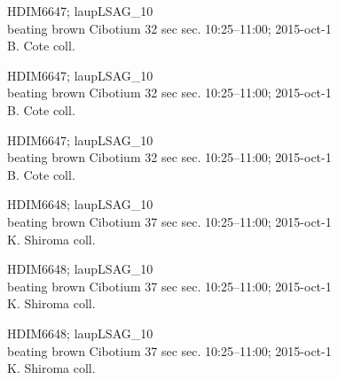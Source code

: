 \documentclass[2pt]{extarticle}
\begin{document}
\noindent
\parbox{0.16\textwidth}{\tiny \raggedright \rule[-0.3\baselineskip]{0pt}{10pt}HDIM6647; laupLSAG\_10\\ beating brown Cibotium 32 sec sec. 10:25--11:00; 2015-oct-1\\ B. Cote coll.}
\parbox{0.16\textwidth}{\tiny \raggedright \rule[-0.3\baselineskip]{0pt}{10pt}HDIM6647; laupLSAG\_10\\ beating brown Cibotium 32 sec sec. 10:25--11:00; 2015-oct-1\\ B. Cote coll.}
\parbox{0.16\textwidth}{\tiny \raggedright \rule[-0.3\baselineskip]{0pt}{10pt}HDIM6647; laupLSAG\_10\\ beating brown Cibotium 32 sec sec. 10:25--11:00; 2015-oct-1\\ B. Cote coll.}
\parbox{0.16\textwidth}{\tiny \raggedright \rule[-0.3\baselineskip]{0pt}{10pt}HDIM6648; laupLSAG\_10\\ beating brown Cibotium 37 sec sec. 10:25--11:00; 2015-oct-1\\ K. Shiroma coll.}
\parbox{0.16\textwidth}{\tiny \raggedright \rule[-0.3\baselineskip]{0pt}{10pt}HDIM6648; laupLSAG\_10\\ beating brown Cibotium 37 sec sec. 10:25--11:00; 2015-oct-1\\ K. Shiroma coll.}
\parbox{0.16\textwidth}{\tiny \raggedright \rule[-0.3\baselineskip]{0pt}{10pt}HDIM6648; laupLSAG\_10\\ beating brown Cibotium 37 sec sec. 10:25--11:00; 2015-oct-1\\ K. Shiroma coll.} \\ 
\vspace{0.001in} 
\end{document}
